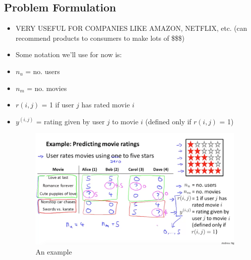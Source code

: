 \documentclass[]{article}
\begin{document}
	\subsection{Problem Formulation}
		\begin{itemize}
			\item VERY USEFUL FOR COMPANIES LIKE AMAZON, NETFLIX, etc. (can recommend products to consumers to make lots of \$\$\$)
			\item Some notation we'll use for now is:
			\item $n_u$ = no. users
			\item $n_m$ = no. movies
			\item $r(i,j)$ = 1 if user $j$ has rated movie $i$
			\item $y^{(i,j)}$ = rating given by user $j$ to movie $i$ (defined only if $r(i,j)$ = 1)
			\begin{figure}[ht!]
				\includegraphics[width= 1.5\textwidth,center]{Movie_Ratings_Example.png}
				\caption{An example}
			\end{figure}
		\end{itemize}
		
\end{document}
